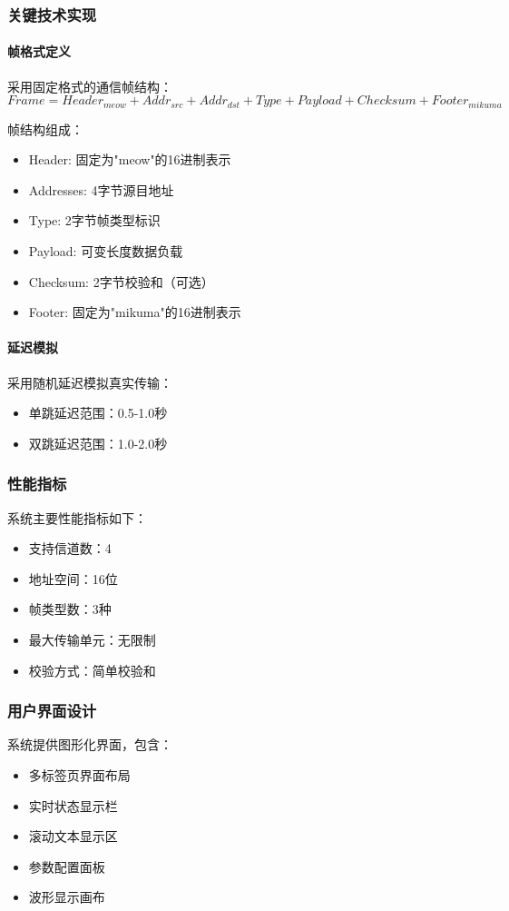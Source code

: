 \documentclass[12pt]{article}
\begin{document}
\subsubsection{关键技术实现}
\paragraph{帧格式定义}
采用固定格式的通信帧结构：
\begin{equation}
Frame = Header_{meow} + Addr_{src} + Addr_{dst} + Type + Payload + Checksum + Footer_{mikuma}
\end{equation}

帧结构组成：
\begin{itemize}
    \item Header: 固定为"meow"的16进制表示
    \item Addresses: 4字节源目地址
    \item Type: 2字节帧类型标识
    \item Payload: 可变长度数据负载
    \item Checksum: 2字节校验和（可选）
    \item Footer: 固定为"mikuma"的16进制表示
\end{itemize}

\paragraph{延迟模拟}
采用随机延迟模拟真实传输：
\begin{itemize}
    \item 单跳延迟范围：0.5-1.0秒
    \item 双跳延迟范围：1.0-2.0秒
\end{itemize}

\subsubsection{性能指标}
系统主要性能指标如下：
\begin{itemize}
    \item 支持信道数：4
    \item 地址空间：16位
    \item 帧类型数：3种
    \item 最大传输单元：无限制
    \item 校验方式：简单校验和
\end{itemize}

\subsubsection{用户界面设计}
系统提供图形化界面，包含：
\begin{itemize}
    \item 多标签页界面布局
    \item 实时状态显示栏
    \item 滚动文本显示区
    \item 参数配置面板
    \item 波形显示画布
\end{itemize}
\end{document}
